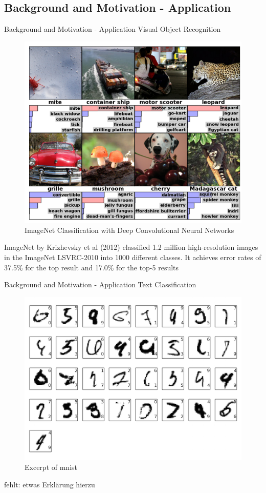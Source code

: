 \documentclass[12pt]{beamer}
\begin{document}
\subsection{Background and Motivation - Application}
\begin{frame}{Background and Motivation - Application}
Visual Object Recognition
\begin{figure}
\centering
\includegraphics[width = 0.4\linewidth]{images/KSH-results.png}
\caption{ImageNet Classification with Deep Convolutional
Neural Networks}
\label{fig:principle}
\end{figure}
ImageNet by Krizhevsky et al (2012) classified 1.2 million
high-resolution images in the ImageNet LSVRC-2010 into 1000 different classes.
It achieves error rates of 37.5\% for the top result and 17.0\% for the top-5 results



\end{frame}

\begin{frame}{Background and Motivation - Application}
Text Classification
\begin{figure}
\centering
\includegraphics[width = 0.4\linewidth]{images/mnist.png}
\caption{Excerpt of mnist}
\label{fig:principle}
\end{figure}
fehlt: etwas Erklärung hierzu
\end{frame}
\end{document}

